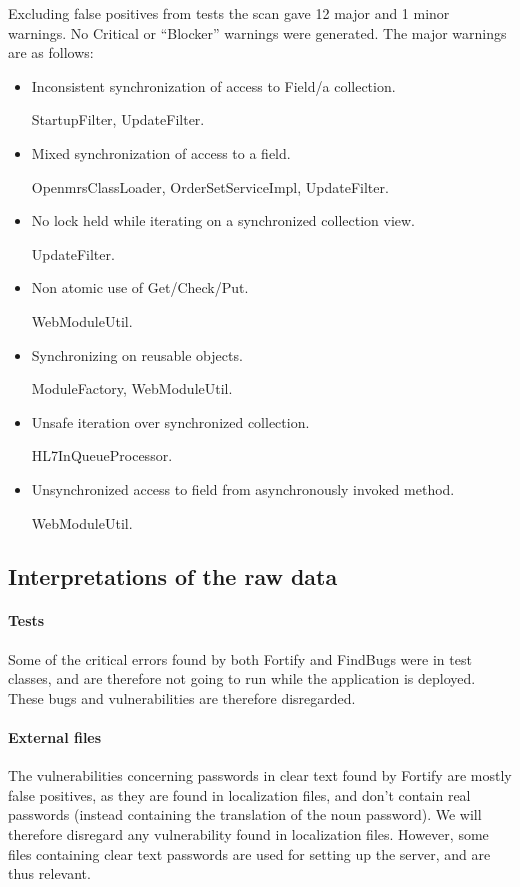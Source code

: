 \documentclass{report} %
\begin{document}
Excluding false positives from tests the scan gave 12 major and 1 minor
warnings. No Critical or ``Blocker'' warnings were generated. The major warnings
are as follows:

\begin{itemize}
\item Inconsistent synchronization of access to Field/a collection.

  StartupFilter, UpdateFilter.

\item Mixed synchronization of access to a field.

  OpenmrsClassLoader, OrderSetServiceImpl, UpdateFilter.
  
\item No lock held while iterating on a synchronized collection view.
  
  UpdateFilter.

\item Non atomic use of Get/Check/Put.

  WebModuleUtil.

\item Synchronizing on reusable objects.

  ModuleFactory, WebModuleUtil.

\item Unsafe iteration over synchronized collection.

  HL7InQueueProcessor.
  
\item Unsynchronized access to field from asynchronously invoked method.
  
  WebModuleUtil.

\end{itemize}

\subsection{Interpretations of the raw data}

\paragraph{Tests}
Some of the critical errors found by both Fortify and FindBugs were in test
classes, and are therefore not going to run while the application is deployed.
These bugs and vulnerabilities are therefore disregarded. 

\paragraph{External files}
The vulnerabilities concerning passwords in clear text found by Fortify are
mostly false positives, as they are found in localization files, and don't
contain real passwords (instead containing the translation of the noun
password). We will therefore disregard any vulnerability found in localization
files. However, some files containing clear text passwords are used for setting
up the server, and are thus relevant.
\end{document}
